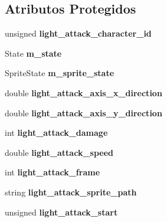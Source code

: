 \subsection*{Atributos Protegidos}
\begin{DoxyCompactItemize}
\item 
\mbox{\label{classLightAttack_ad046f76650219d857e58f301b3c93e70}} 
unsigned {\bfseries light\+\_\+attack\+\_\+character\+\_\+id}
\item 
\mbox{\label{classLightAttack_ad98d1f8f6cd1578461fc200f53758e1a}} 
State {\bfseries m\+\_\+state}
\item 
\mbox{\label{classLightAttack_a35e5a2ed495b159eb73d27e04cc6f489}} 
Sprite\+State {\bfseries m\+\_\+sprite\+\_\+state}
\item 
\mbox{\label{classLightAttack_a6a0c4b116ccc6e440bb4a7751903b386}} 
double {\bfseries light\+\_\+attack\+\_\+axis\+\_\+x\+\_\+direction}
\item 
\mbox{\label{classLightAttack_a152fe7cc652d6f2965aa4b598f1b5b4f}} 
double {\bfseries light\+\_\+attack\+\_\+axis\+\_\+y\+\_\+direction}
\item 
\mbox{\label{classLightAttack_a33ff61300d69a5227cdc7a41c4de9a61}} 
int {\bfseries light\+\_\+attack\+\_\+damage}
\item 
\mbox{\label{classLightAttack_a2020d5cc3d91c3f4c597e50bfb249d19}} 
double {\bfseries light\+\_\+attack\+\_\+speed}
\item 
\mbox{\label{classLightAttack_a28c2ddb59b87f80ab69c6b4676395bf8}} 
int {\bfseries light\+\_\+attack\+\_\+frame}
\item 
\mbox{\label{classLightAttack_a252572bfbcf4d80aca70f11e3dc3a4bd}} 
string {\bfseries light\+\_\+attack\+\_\+sprite\+\_\+path}
\item 
\mbox{\label{classLightAttack_af67aff57a2acdac82b0d0a090af783d7}} 
unsigned {\bfseries light\+\_\+attack\+\_\+start}
\item 

\end{DoxyCompactItemize}
